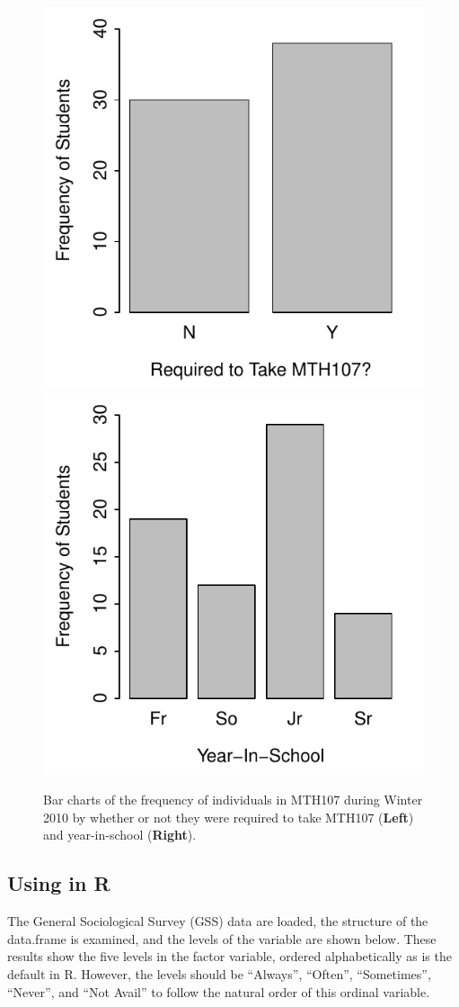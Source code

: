 \documentclass[10pt,openany]{book}\usepackage[]{graphicx}\usepackage[]{color}
\newenvironment{knitrout}{}{} %
\begin{document}
\begin{knitrout}
\color{fgcolor}\begin{figure}[hbtp]

{\centering \includegraphics[width=.4\linewidth]{Figs/MTH107BarChart-1} 
\includegraphics[width=.4\linewidth]{Figs/MTH107BarChart-2} 

}

\caption[Bar charts of the frequency of individuals in MTH107 during Winter 2010 by whether or not they were required to take MTH107 (\textbf{Left}) and year-in-school (\textbf{Right})]{Bar charts of the frequency of individuals in MTH107 during Winter 2010 by whether or not they were required to take MTH107 (\textbf{Left}) and year-in-school (\textbf{Right}).}\label{fig:MTH107BarChart}
\end{figure}


\end{knitrout}



\subsection{Using in R}
The General Sociological Survey (GSS) data are loaded, the structure of the data.frame is examined, and the levels of the  variable are shown below. These results show the five levels in the  factor variable, ordered alphabetically as is the default in R. However, the levels should be ``Always'', ``Often'', ``Sometimes'', ``Never'', and ``Not Avail'' to follow the natural order of this ordinal variable.
\end{document}
